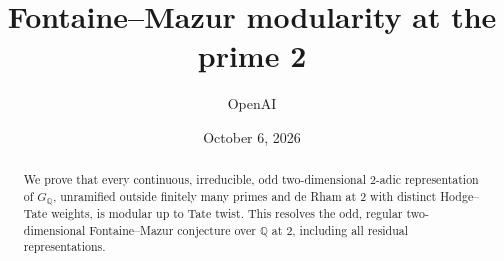 \documentclass[11pt]{article}
\title{Fontaine--Mazur modularity at the prime 2}
\author{OpenAI}
\date{October 6, 2026}
\theoremstyle{definition}
\theoremstyle{remark}
\begin{document}
\maketitle
\begin{abstract}
We prove that every continuous, irreducible, odd two-dimensional
\(2\)-adic representation of \(G_{\mathbb Q}\), unramified outside
finitely many primes and de Rham at \(2\) with distinct Hodge--Tate
weights, is modular up to Tate twist. This resolves the odd, regular
two-dimensional Fontaine--Mazur conjecture over \(\mathbb Q\) at \(2\),
including all residual representations.
\end{abstract}


\clearpage
\begingroup
\small
\tableofcontents
\endgroup
\clearpage










\end{document}
